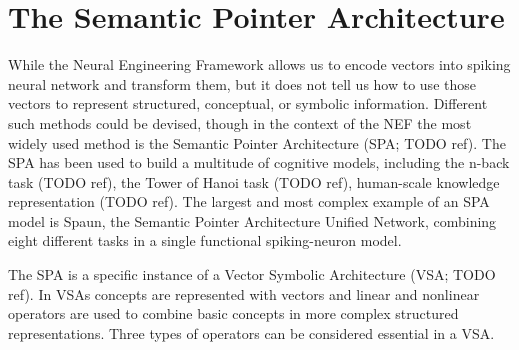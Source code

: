 \chapter{The Semantic Pointer Architecture}
While the Neural Engineering Framework allows us to encode vectors into spiking neural network and transform them, but it does not tell us how to use those vectors to represent structured, conceptual, or symbolic information.
Different such methods could be devised, though in the context of the NEF the most widely used method is the Semantic Pointer Architecture (SPA\@; TODO ref).
The SPA has been used to build a multitude of cognitive models, including the n-back task (TODO ref), the Tower of Hanoi task (TODO ref), human-scale knowledge representation (TODO ref).
The largest and most complex example of an SPA model is Spaun, the Semantic Pointer Architecture Unified Network, combining eight different tasks in a single functional spiking-neuron model.

The SPA is a specific instance of a Vector Symbolic Architecture (VSA\@; TODO ref).
In VSAs concepts are represented with vectors and linear and nonlinear operators are used to combine basic concepts in more complex structured representations.
Three types of operators can be considered essential in a VSA\@.


